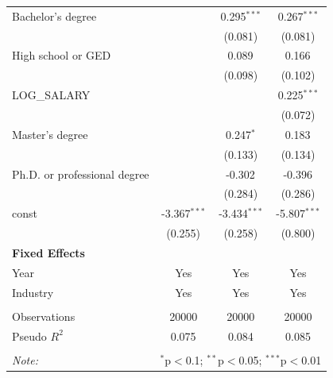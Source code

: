 \begin{table}[!htbp]
\begin{tabular}{@{\extracolsep{5pt}}lccc}
 Bachelor's degree & & 0.295$^{***}$ & 0.267$^{***}$ \\
& & (0.081) & (0.081) \\
 High school or GED & & 0.089$^{}$ & 0.166$^{}$ \\
& & (0.098) & (0.102) \\
 LOG_SALARY & & & 0.225$^{***}$ \\
& & & (0.072) \\
 Master's degree & & 0.247$^{*}$ & 0.183$^{}$ \\
& & (0.133) & (0.134) \\
 Ph.D. or professional degree & & -0.302$^{}$ & -0.396$^{}$ \\
& & (0.284) & (0.286) \\
 const & -3.367$^{***}$ & -3.434$^{***}$ & -5.807$^{***}$ \\
& (0.255) & (0.258) & (0.800) \\
 \textbf{Fixed Effects} &  &  &  \\
 Year & Yes & Yes & Yes \\
 Industry & Yes & Yes & Yes \\
\hline \\[-1.8ex]
 Observations & 20000 & 20000 & 20000 \\
 Pseudo $R^2$ & 0.075 & 0.084 & 0.085 \\
\hline
\hline \\[-1.8ex]
\textit{Note:} & \multicolumn{3}{r}{$^{*}$p$<$0.1; $^{**}$p$<$0.05; $^{***}$p$<$0.01} \\
\end{tabular}
\end{table}